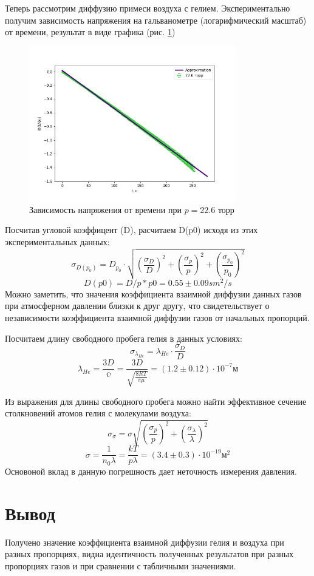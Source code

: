 \documentclass[a4paper,12pt]{article} %
\begin{document}
Теперь рассмотрим диффузию примеси воздуха с гелием. Экспериментально получим зависимость напряжения на гальванометре (логарифмический масштаб) от времени, результат в виде графика (рис. \ref{u5})

\begin{figure}[h!]
\begin{center}
\includegraphics[width=0.8\textwidth]{U(t)+22}
\end{center}
\caption{Зависимость напряжения от времени при $p=22.6$ торр} \label{u5}
\end{figure}
Посчитав угловой коэффицент (D), расчитаем D(p0) исходя из этих экспериментальных данных:
\begin{equation}
\sigma_{D(p_0)}=D_{p_0}\cdot \sqrt{(\frac{\sigma_D}{D})^2+(\frac{\sigma_p}{p})^2+(\frac{\sigma_{p_0}}{p_0})^2}
\end{equation}
\begin{equation}
D(p0)=D/p*p0 = 0.55 \pm 0.09 sm^2/s
\end{equation}
Можно заметить, что значения коэффициента взаимной диффузии данных газов при атмосферном давлении близки к друг другу, что свидетельствует о независимости коэффициента взаимной диффузии газов от начальных пропорций.

Посчитаем длину свободного пробега гелия в данных условиях:
\begin{equation}
\sigma_{\lambda_{He}} = \lambda_{He}\cdot \frac{\sigma_D}{D}
\end{equation}
\begin{equation}
\lambda_{He} = \frac{3D}{\bar{\upsilon}} = \frac{3D}{\sqrt{\frac{8RT}{\pi \mu}}}= ( 1.2 \pm 0.12 ) \cdot 10^{-7} \text{м}
\end{equation}

Из выражения для длины свободного пробега можно найти эффективное сечение столкновений атомов гелия с молекулами воздуха:
\begin{equation}
\sigma_\sigma = \sigma \sqrt{(\frac{\sigma_p}{p})^2+(\frac{\sigma_\lambda}{\lambda})^2}
\end{equation}
\begin{equation}
\sigma = \frac{1}{n_0\lambda} = \frac{kT}{p\lambda}= ( 3.4 \pm 0.3 ) \cdot 10^{-19} \text{м}^2
\end{equation}
Основоной вклад в данную погрешность дает неточность измерения давления.


\section{Вывод}
Получено значение коэффициента взаимной диффузии гелия и воздуха при разных пропорциях, видна идентичность полученных результатов при разных пропорциях газов и при сравнении с табличными значениями.
\end{document}
